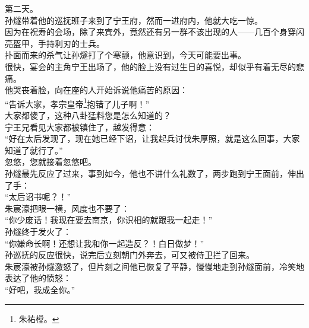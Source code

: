 \begin{multicols}{\theparacolNo}
第二天。\\

孙燧带着他的巡抚班子来到了宁王府，然而一进府内，他就大吃一惊。\\

因为在祝寿的会场，除了来宾外，竟然还有另一群不该出现的人——几百个身穿闪亮盔甲，手持利刃的士兵。\\

扑面而来的杀气让孙燧打了个寒颤，他意识到，今天可能要出事。\\

很快，宴会的主角宁王出场了，他的脸上没有过生日的喜悦，却似乎有着无尽的悲痛。\\

他哭丧着脸，向在座的人开始诉说他痛苦的原因：\\

“告诉大家，孝宗皇帝\footnote{朱祐樘。}抱错了儿子啊！”\\

大家都傻了，这种八卦猛料您是怎么知道的？\\

宁王兄看见大家都被镇住了，越发得意：\\

“好在太后发现了，现在她已经下诏，让我起兵讨伐朱厚照，就是这么回事，大家知道了就行了。”\\

忽悠，您就接着忽悠吧。\\

孙燧最先反应了过来，事到如今，他也不讲什么礼数了，两步跑到宁王面前，伸出了手：\\

“太后诏书呢？！”\\

朱宸濠把眼一横，风度也不要了：\\

“你少废话！我现在要去南京，你识相的就跟我一起走！”\\

孙燧终于发火了：\\

“你嫌命长啊！还想让我和你一起造反？！白日做梦！”\\

孙巡抚的反应很快，说完后立刻朝门外奔去，可又被侍卫拦了回来。\\

朱宸濠被孙燧激怒了，但片刻之间他已恢复了平静，慢慢地走到孙燧面前，冷笑地表达了他的愤怒：\\

“好吧，我成全你。”\\


\end{multicols}
